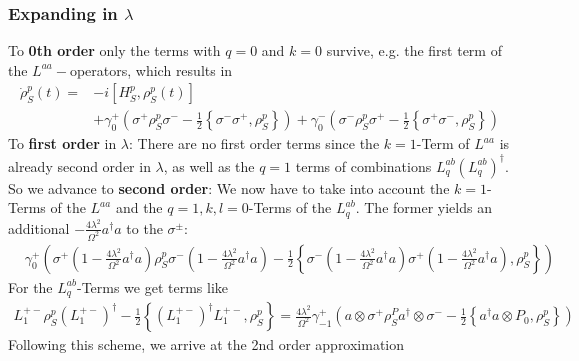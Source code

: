	\subsubsection{Expanding in $\lambda$}
	To \textbf{0th order} only the terms with $q=0$ and $k=0$ survive, e.g. the first term of the $L^{aa}-$operators, which results in
	\begin{align*}
		\dot{\rho}_S^p(t) = &-i \left[H_S^p,  {\rho}_S^p(t)\right] \\
		&+\gamma_0^+ \left( \sigma^+ \rho_S^p \sigma^- - \frac{1}{2} \left\{\sigma^- \sigma^+, \rho_S^p \right\}\right) + \gamma_0^- \left(  \sigma^- \rho_S^p \sigma^+ - \frac{1}{2} \left\{\sigma^+ \sigma^-, \rho_S^p \right\}\right)
	\end{align*}
	To \textbf{first order} in $\lambda$: There are no first order terms since the $k=1$-Term of $L^{aa}$ is already second order in $\lambda$, as well as the $q=1$ terms of combinations $L_q^{ab}(L_q^{ab})^\dagger$. So we advance to \textbf{second order}: We now have to take into account the $k=1$-Terms of the $L^{aa}$ and the $q = 1, k,l =	0$-Terms of the $L^{ab}_q$. The former yields an additional $-\frac{4\lambda^2}{\Omega^2} a^\dagger a$ to the $\sigma^\pm$:
	\begin{align*}
		&\gamma_0^+ \left( \sigma^+\left(1 - \frac{4 \lambda^2}{\Omega^2} a^\dagger a\right)\rho_S^p \sigma^- \left(1 - \frac{4 \lambda^2}{\Omega^2} a^\dagger a\right) - \frac{1}{2} \left\{\sigma^-\left(1 - \frac{4 \lambda^2}{\Omega^2} a^\dagger a\right) \sigma^+ \left(1 - \frac{4 \lambda^2}{\Omega^2} a^\dagger a\right), \rho_S^p \right\}\right)
	\end{align*}
	For the $L^{ab}_q$-Terms we get terms like
	\begin{align*}
		L_1^{+-} \rho_S^p \left(L_1^{+-}\right)^\dagger - \frac{1}{2} \left\{\left(L_1^{+-}\right)^\dagger L_1^{+-}, \rho_S^p \right\} =	\frac{4 \lambda^2}{\Omega^2} \gamma_{-1}^+ \left(a \otimes \sigma^+ \rho_S^P a^\dagger \otimes \sigma^-  - \frac{1}{2} \left\{a^\dagger a \otimes P_0, \rho_S^p\right\}\right)
	\end{align*}
	Following this scheme, we arrive at the 2nd order approximation
